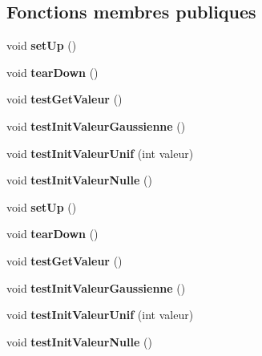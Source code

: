 \subsection*{Fonctions membres publiques}
\begin{DoxyCompactItemize}
\item 
\mbox{\label{class_test_tenseur_a52db9b85a9aea7ae91c5f4d6f7ca2615}} 
void {\bfseries set\+Up} ()
\item 
\mbox{\label{class_test_tenseur_afd5cb5d1ff64bc398e8d18ac9eaa00c9}} 
void {\bfseries tear\+Down} ()
\item 
\mbox{\label{class_test_tenseur_a8bf3e16120293a440787b7094894fd6e}} 
void {\bfseries test\+Get\+Valeur} ()
\item 
\mbox{\label{class_test_tenseur_a771d6bd087d586718600b270bd9c51f0}} 
void {\bfseries test\+Init\+Valeur\+Gaussienne} ()
\item 
\mbox{\label{class_test_tenseur_a8daa25d92350bec7717fb97cd8c4868c}} 
void {\bfseries test\+Init\+Valeur\+Unif} (int valeur)
\item 
\mbox{\label{class_test_tenseur_a9ed1780c80804210fb84e7d2f3213d05}} 
void {\bfseries test\+Init\+Valeur\+Nulle} ()
\item 
\mbox{\label{class_test_tenseur_a52db9b85a9aea7ae91c5f4d6f7ca2615}} 
void {\bfseries set\+Up} ()
\item 
\mbox{\label{class_test_tenseur_afd5cb5d1ff64bc398e8d18ac9eaa00c9}} 
void {\bfseries tear\+Down} ()
\item 
\mbox{\label{class_test_tenseur_a8bf3e16120293a440787b7094894fd6e}} 
void {\bfseries test\+Get\+Valeur} ()
\item 
\mbox{\label{class_test_tenseur_a771d6bd087d586718600b270bd9c51f0}} 
void {\bfseries test\+Init\+Valeur\+Gaussienne} ()
\item 
\mbox{\label{class_test_tenseur_a8daa25d92350bec7717fb97cd8c4868c}} 
void {\bfseries test\+Init\+Valeur\+Unif} (int valeur)
\item 
\mbox{\label{class_test_tenseur_a9ed1780c80804210fb84e7d2f3213d05}} 
void {\bfseries test\+Init\+Valeur\+Nulle} ()
\end{DoxyCompactItemize}


